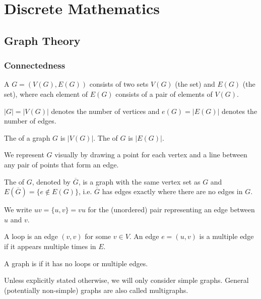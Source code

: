 \part{Discrete Mathematics}
\chapter{Graph Theory}

\section{Connectedness}
\begin{definition}[Graph]
A  $G=(V(G),E(G))$ consists of two sets $V(G)$ (the  set) and $E(G)$ (the  set), where each element of $E(G)$ consists of a pair of elements of $V(G)$.
\end{definition}

\begin{notation}
$|G|=|V(G)|$ denotes the number of vertices and $e(G) =|E(G)|$ denotes the number of edges.
\end{notation}

The  of a graph $G$ is $|V(G)|$. The  of $G$ is $|E(G)|$.

We represent $G$ visually by drawing a point for each vertex and a line between any pair of points that form an edge.

The  of $G$, denoted by $\overline{G}$, is a graph with the same vertex set as $G$ and $E(\overline{G}) = \{e \notin E(G)\}$, i.e. $\overline{G}$ has edges exactly where there are no edges in $G$.

\begin{notation}
We write $uv=\{u,v\}=vu$ for the (unordered) pair representing an edge between $u$ and $v$.
\end{notation}

\begin{definition}
A loop is an edge $(v,v)$ for some $v \in V$. An edge $e=(u,v)$ is a multiple edge if it appears multiple times in $E$. 

A graph is  if it has no loops or multiple edges.
\end{definition}

\begin{remark}
Unless explicitly stated otherwise, we will only consider simple graphs. General (potentially non-simple) graphs are also called multigraphs.
\end{remark}

